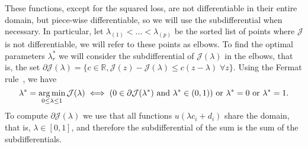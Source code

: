 %
These functions, except for the squared loss, are not differentiable in their entire domain, but piece-wise differentiable, so we will use the subdifferential when necessary.  In particular, let ${\lambda}_{(1)} < \ldots < {\lambda}_{(p)}$ be the sorted list of points where $\mathcal{J}$ is not differentiable, we will refer to these points as elbows.
To find the optimal parameters $\lambda_r^*$ we will consider the subdifferential of $\mathcal{J}(\lambda)$ in the elbows, that is, the set $\partial \mathcal{J}(\lambda) = \{c \in \mathbb{R}, \mathcal{J}(z)-\mathcal{J}(\lambda) \leq c (z - \lambda)\;  \forall z \}$.
%
Using the Fermat rule~\citep{BauschkeC11}, we have
\begin{equation}
    \nonumber
    \lambda^* = \operatorname*{arg\min}_{0 \leq \lambda \leq 1} \mathcal{J}(\lambda) \iff (0 \in \partial \mathcal{J}(\lambda^*) \text{ and } \lambda^* \in (0, 1) ) \text{ or } \lambda^*=0 \text{ or } \lambda^*=1 .
\end{equation}
To compute $\partial \mathcal{J}(\lambda)$ we use that all functions $u(\lambda c_i + d_i)$ share the domain, that is, $\lambda \in [0, 1]$, and therefore the subdifferential of the sum is the sum of the subdifferentials.
%


